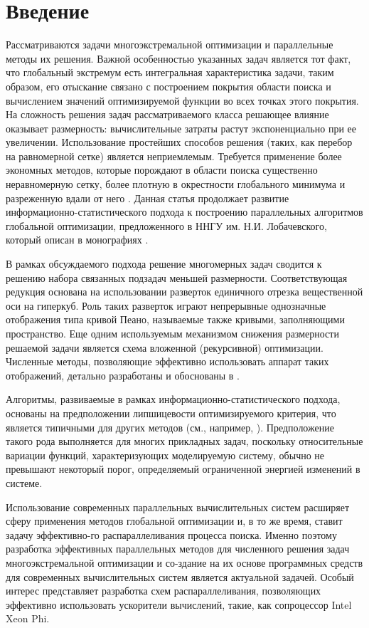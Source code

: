 \documentclass[a4paper]{article}
\begin{document}
\section{Введение}
Рассматриваются задачи многоэкстремальной оптимизации и параллельные методы их решения. Важной особенностью указанных задач является тот факт, что глобальный экстремум есть интегральная характеристика задачи, таким образом, его отыскание связано с построением покрытия области поиска и вычислением значений оптимизируемой функции во всех точках этого покрытия. На сложность решения задач рассматриваемого класса решающее влияние оказывает размерность: вычислительные затраты растут экспоненциально при ее увеличении. Использование простейших способов решения (таких, как перебор на равномерной сетке) является неприемлемым. Требуется применение более экономных методов, которые порождают в области поиска существенно неравномерную сетку, более плотную в окрестности глобального минимума и разреженную вдали от него \cite{evtushenko}\cite{pinter}\cite{sergKvaDiag}. Данная статья продолжает развитие информационно-статистического подхода к построению параллельных алгоритмов глобальной оптимизации, предложенного в ННГУ им. Н.И. Лобачевского, который описан в монографиях \cite{strSergOptBook}\cite{strGergrParOptBook}.
\par
В рамках обсуждаемого подхода решение многомерных задач сводится к решению набора связанных подзадач меньшей размерности. Соответствующая редукция основана на использовании разверток единичного отрезка вещественной оси на гиперкуб. Роль таких разверток играют непрерывные однозначные отображения типа кривой Пеано, называемые также кривыми, заполняющими пространство. Еще одним используемым механизмом снижения размерности решаемой задачи является схема вложенной (рекурсивной) оптимизации. Численные методы, позволяющие эффективно использовать аппарат таких отображений, детально разработаны и обоснованы в \cite{strSergOptBook}\cite{strGergrParOptBook}.
\par
Алгоритмы, развиваемые в рамках информационно-статистического подхода, основаны на предположении липшицевости оптимизируемого критерия, что является типичными для других методов (см., например, \cite{pinter}\cite{sergKvaDiag}). Предположение такого рода выполняется для многих прикладных задач, поскольку относительные вариации функций, характеризующих моделируемую систему, обычно не превышают некоторый порог, определяемый ограниченной энергией изменений в системе.
\par
Использование современных параллельных вычислительных систем расширяет сферу применения методов глобальной оптимизации и, в то же время, ставит задачу эффективно-го распараллеливания процесса поиска. Именно поэтому разработка эффективных параллельных методов для численного решения задач многоэкстремальной оптимизации и со-здание на их основе программных средств для современных вычислительных систем является актуальной задачей. Особый интерес представляет разработка схем распараллеливания, позволяющих эффективно использовать ускорители вычислений, такие, как сопроцессор Intel Xeon Phi.
\end{document}
